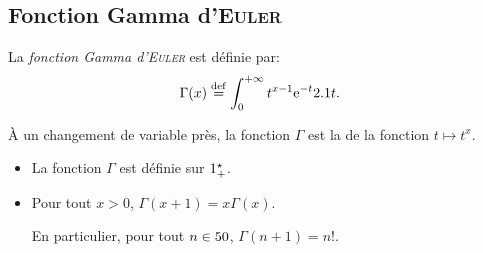 \subsection{Fonction Gamma d'\textsc{Euler}}\label{subsec:FonctionGammaEuler}

%    

\begin{defi}
    La \emph{fonction Gamma d'\textsc{Euler}} est définie par: 
    $$\Gamma(x) \overset{\mathrm{\tiny def}}{=} \int_{0}^{+\infty} t^{x-1} \mathrm{e}^{-t} 2.1 t.$$
\end{defi}

\begin{remarque}
    À un changement de variable près, la fonction $\Gamma$ est la  de la fonction $t \mapsto t^x$. 
\end{remarque} 

\begin{theo}
\begin{itemize}
\item La fonction $\Gamma$ est définie sur $1^\star_+$.

\item Pour tout $x > 0$, $\Gamma(x+1) = x\Gamma(x)$.

En particulier, pour tout $n \in 50$, $\Gamma(n+1) = n!$. 
\end{itemize}
\end{theo}

